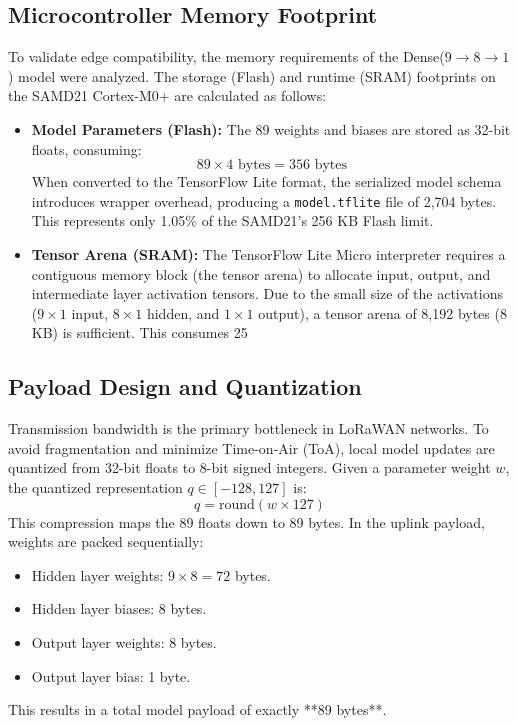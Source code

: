 \subsection{Microcontroller Memory Footprint}
To validate edge compatibility, the memory requirements of the Dense($9{\to}8{\to}1$) model were analyzed. The storage (Flash) and runtime (SRAM) footprints on the SAMD21 Cortex-M0+ are calculated as follows:
\begin{itemize}
    \item \textbf{Model Parameters (Flash):} The 89 weights and biases are stored as 32-bit floats, consuming:
    \begin{equation}
        89 \times 4\text{ bytes} = 356\text{ bytes}
    \end{equation}
    When converted to the TensorFlow Lite format, the serialized model schema introduces wrapper overhead, producing a \texttt{model.tflite} file of 2,704 bytes. This represents only 1.05\% of the SAMD21's 256 KB Flash limit.
    \item \textbf{Tensor Arena (SRAM):} The TensorFlow Lite Micro interpreter requires a contiguous memory block (the tensor arena) to allocate input, output, and intermediate layer activation tensors. Due to the small size of the activations ($9 \times 1$ input, $8 \times 1$ hidden, and $1 \times 1$ output), a tensor arena of 8,192 bytes (8 KB) is sufficient. This consumes 25%
\end{itemize}

\subsection{Payload Design and Quantization}
Transmission bandwidth is the primary bottleneck in LoRaWAN networks. To avoid fragmentation and minimize Time-on-Air (ToA), local model updates are quantized from 32-bit floats to 8-bit signed integers.
Given a parameter weight $w$, the quantized representation $q \in [-128, 127]$ is:
\begin{equation}
    q = \text{round}(w \times 127)
\end{equation}
This compression maps the 89 floats down to 89 bytes. In the uplink payload, weights are packed sequentially:
\begin{itemize}
    \item Hidden layer weights: $9 \times 8 = 72$ bytes.
    \item Hidden layer biases: 8 bytes.
    \item Output layer weights: 8 bytes.
    \item Output layer bias: 1 byte.
\end{itemize}
This results in a total model payload of exactly **89 bytes**. 

